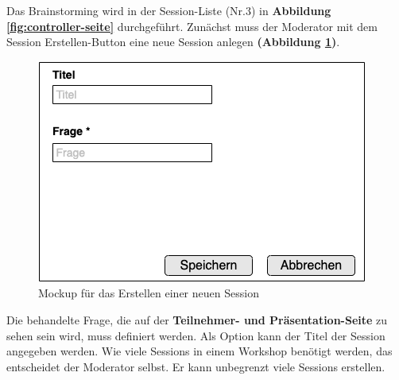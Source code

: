 Das Brainstorming wird in der Session-Liste (Nr.3) in \textbf{Abbildung \ref{fig:controller-seite}} durchgeführt. Zunächst muss der Moderator mit dem \glqq Session Erstellen\grqq{}-Button eine neue Session anlegen \textbf{(Abbildung \ref{fig:mockup für das erstellen einer neuen session})}.\bigskip

\begin{figure}[H]
  \begin{center}
    \includegraphics[scale=0.45]{img/session_erstellen}
	\caption{Mockup für das Erstellen einer neuen Session}  
	\label{fig:mockup für das erstellen einer neuen session}
  \end{center}   
\end{figure}

Die behandelte Frage, die auf der \textbf{Teilnehmer- und Präsentation-Seite} zu sehen sein wird, muss definiert werden. Als Option kann der Titel der Session angegeben werden. Wie viele Sessions in einem Workshop benötigt werden, das entscheidet der Moderator selbst. Er kann unbegrenzt viele Sessions erstellen.

